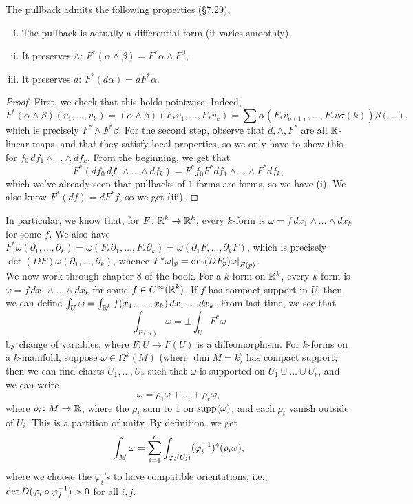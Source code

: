The pullback admits the following properties (\S7.29),
\begin{enumerate}[(i)]
    \item The pullback is actually a differential form (it varies smoothly).
    \item It preserves $\wedge$: $F^\ast(\alpha \wedge \beta) = F^\ast \alpha \wedge F^\beta$,
    \item It preserves $d$: $F^\ast (d\alpha) = d F^\ast \alpha$.
\end{enumerate}
\begin{proof}
    First, we check that this holds pointwise. Indeed,
    \[ F^\ast(\alpha \wedge \beta)(v_1, \dots, v_k) = (\alpha \wedge \beta)(F_\ast v_1, \dots, F_\ast v_k) = \sum \alpha (F_\ast v_{\sigma(1)}, \dots, F_\ast v{\sigma(k)}) \beta(\dots), \]
    which is precisely $F^\ast \wedge F^\ast \beta$. For the second step, observe that $d, \wedge, F^\ast$ are all $\mathbb R$-linear maps, and that they satisfy local properties, so we only have to show this for $f_0 \, df_1 \wedge \dots \wedge df_k$. From the beginning, we get that
    \[ F^\ast(df_0 \, df_1 \wedge \dots \wedge df_k) = F^\ast f_0 F^\ast df_1 \wedge \dots \wedge F^\ast df_k, \]
    which we've already seen that pullbacks of $1$-forms are forms, so we have (i). We also know $F^\ast(df) = dF^\ast f$, so we get (iii).
\end{proof}
In particular, we know that, for $F \colon \mathbb R^k \to \mathbb R^k$, every $k$-form is $\omega = f \, dx_1 \wedge \dots \wedge dx_k$ for some $f$. We also have $F^\ast \omega(\partial_1, \dots, \partial_k) = \omega(F_\ast \partial_1, \dots, F_\ast \partial_k) = \omega(\partial_1 F, \dots, \partial_k F)$, which is precisely $\det (DF) \omega(\partial_1, \dots, \partial_k)$, whence $F^\ast \omega \rvert_p = \det (DF_p) \restr{\omega}{F(p)}$.
\\[8pt]
We now work through chapter 8 of the book. For a $k$-form on $\mathbb R^k$, every $k$-form is $\omega = f \, dx_1 \wedge \dots \wedge dx_k$ for some $f \in C^\infty(\mathbb R^k)$. If $f$ has compact support in $U$, then we can define $\int_U \omega = \int_{\mathbb R^k} f(x_1, \dots, x_k) \, dx_1 \dots dx_k$. From last time, we see that
\[ \int_{F(u)} \omega = \pm \int_U F^\ast \omega \]
by change of variables, where $F \colon U \to F(U)$ is a diffeomorphism. For $k$-forms on a $k$-manifold, suppose $\omega \in \Omega^k(M)$ (where $\dim M = k$) has compact support; then we can find charts $U_1, \dots, U_r$ such that $\omega$ is supported on $U_1 \cup \dots \cup U_r$, and we can write
\[ \omega = \rho_1 \omega + \dots + \rho_r \omega, \]
where $\rho_i \colon M \to \mathbb R$, where the $\rho_i$ sum to $1$ on $\operatorname{supp}(\omega)$, and each $\rho_i$ vanish outside of $U_i$. This is a partition of unity. By definition, we get
\[ \int_M \omega = \sum_{i=1}^r \int_{\varphi_i(U_i)} (\varphi_i^{-1})^\ast (\rho_i \omega), \]
where we choose the $\varphi_i$'s to have compatible orientations, i.e., $\det D(\varphi_i \circ \varphi_j^{-1}) > 0$ for all $i, j$.